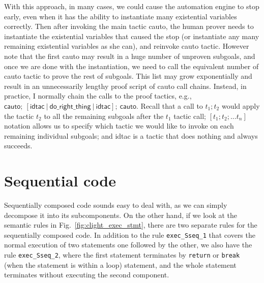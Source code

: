With this approach, in many cases, we could cause the automation engine to stop early,
even when it has the ability to instantiate many existential variables correctly.
Then after invoking the main tactic \textsf{cauto}, the human prover needs to
instantiate the existential variables that caused the stop (or instantiate
any many remaining existential variables as she can), and reinvoke \textsf{cauto}
tactic. However note that the first \textsf{cauto} may result in a huge number
of unproven subgoals, and once we are done with the instantiation, we need to call
the equivalent number of \textsf{cauto} tactic to prove the rest of subgoals.
This list may grow exponentially and result in an unnecessarily lengthy proof
script of \textsf{cauto} call chains.
Instead, in practice, I normally chain the calls to the proof tactics, e.g.,
$\textsf{cauto};~[\textsf{idtac}~|~\textsf{do\_right\_thing}~|~\textsf{idtac}];
~\textsf{cauto}$. 
Recall that a call to $t_1;t_2$ would apply the tactic $t_2$ to all the remaining
subgoals after the $t_1$ tactic call; $[t_1;t_2;...t_n]$ notation allows
us to specify which tactic we would like to invoke on each remaining individual
subgoals; and \textsf{idtac} is a tactic that does nothing and always succeeds.


\section{Sequential code}

Sequentially composed code sounds easy to deal with, as we can simply
decompose it into its subcomponents. On the other hand,
if we look at the semantic rules in Fig.~\ref{fig:clight_exec_stmt}, there are
two separate rules for the sequentially composed code. In addition to the rule
\texttt{exec\_Sseq\_1} that covers the normal execution of two statements
one followed by the other, we also have the rule \texttt{exec\_Sseq\_2},
where the first statement terminates by \texttt{return} or \texttt{break}
(when the statement is within a loop) statement, and the whole statement
terminates without executing the second component.

